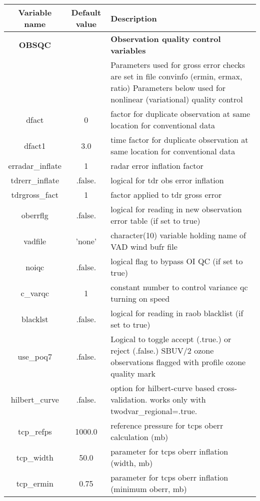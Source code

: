 \begin{table}[h]
 \footnotesize
 \center
 \begin{tabular}{| c | c | p{9cm} |}
 \hline
 Variable name & Default value & Description \\
 \hline
 \textbf{OBSQC} &     & \textbf{Observation quality control variables} \\
          & &  Parameters used for gross error checks are set in file convinfo (ermin, ermax, ratio)
          Parameters below used for nonlinear (variational) quality control \\
  \hline
  dfact & 0 & factor for duplicate observation at same location for conventional data \\
  \hline
  dfact1 & 3.0 & time factor for duplicate observation at same location for conventional data \\
  \hline
  erradar\_inflate & 1 & radar error inflation factor \\
  \hline
  tdrerr\_inflate & .false. & logical for tdr obs error inflation \\
  \hline
  tdrgross\_fact & 1 & factor applied to tdr gross error \\
  \hline
  oberrflg & .false. & logical for reading in new observation error table (if set to true) \\
  \hline
  vadfile & 'none' & character(10) variable holding name of VAD wind bufr file \\
  \hline
  noiqc & .false. & logical flag to bypass OI QC (if set to true) \\
  \hline
  c\_varqc & 1 & constant number to control variance qc turning on speed \\
  \hline
  blacklst & .false. & logical for reading in raob blacklist (if set to true) \\
  \hline
  use\_poq7 & .false. & Logical to toggle accept (.true.) or reject (.false.) SBUV/2 ozone observations flagged with profile ozone quality mark \\
  \hline
  hilbert\_curve & .false. & option for hilbert-curve based cross-validation. works only with twodvar\_regional=.true. \\
  \hline
  tcp\_refps & 1000.0 & reference pressure for tcps oberr calculation (mb) \\
  \hline
  tcp\_width & 50.0 & parameter for tcps oberr inflation (width, mb) \\
  \hline
  tcp\_ermin & 0.75 & parameter for tcps oberr inflation (minimum oberr, mb) \\

\end{tabular}
\end{table}
